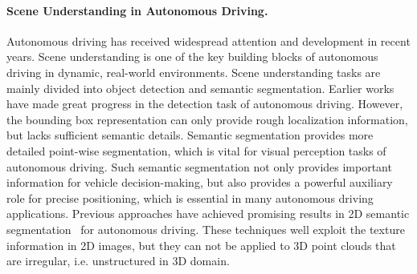 \documentclass{sip}%
\begin{document}
\paragraph{Scene Understanding in Autonomous Driving.}
Autonomous driving has received widespread attention and development in recent years.
Scene understanding is one of the key building blocks of autonomous driving in dynamic, real-world environments.
Scene understanding tasks are mainly divided into object detection and semantic segmentation.
Earlier works~\cite{maturana2015voxnet,qi2016volumetric,song2016deep,wang2019frustum,shi2018pointrcnn} have made great progress in the detection task of autonomous driving.
However, the bounding box representation can only provide rough localization information, but lacks sufficient semantic details. 
Semantic segmentation provides more detailed point-wise segmentation, which is vital for visual perception tasks of autonomous driving. Such semantic segmentation not only provides important information for vehicle decision-making, but also provides a powerful auxiliary role for precise positioning, which is essential in many autonomous driving applications.
Previous approaches have achieved promising results in 2D semantic segmentation~\cite{yang2018segstereo,wang2018understanding,teichmann2018multinet} for autonomous driving.
These techniques well exploit the texture information in 2D images, but they can not be applied to 3D point clouds that are irregular, i.e. unstructured in 3D domain.
\end{document}
